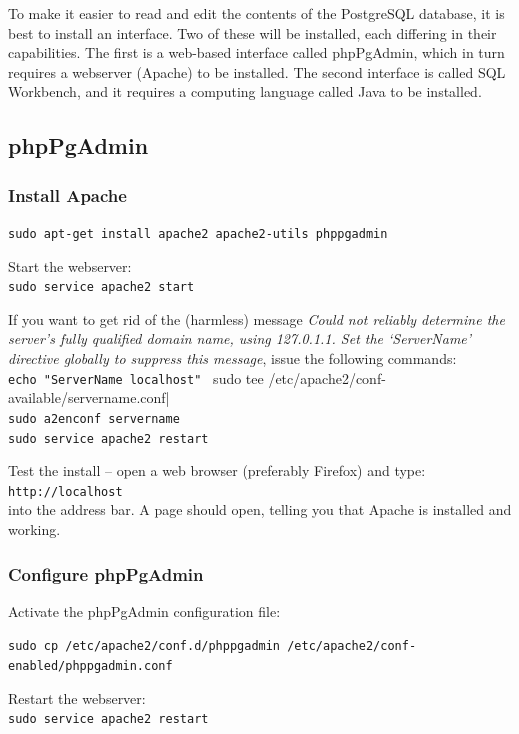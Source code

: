 To make it easier to read and edit the contents of the PostgreSQL database, it is best to install an interface.  Two of these will be installed, each differing in their capabilities.  The first is a web-based interface called phpPgAdmin, which in turn requires a webserver (Apache) to be installed.  The second interface is called SQL Workbench, and it requires a computing language called Java to be installed.

\subsection{phpPgAdmin}

\subsubsection{Install Apache}
\label{ss:apache}

\verb|sudo apt-get install apache2 apache2-utils phppgadmin|

Start the webserver:\\
\verb|sudo service apache2 start|

If you want to get rid of the (harmless) message \textit{Could not reliably determine the server's fully qualified domain name, using 127.0.1.1. Set the `ServerName' directive globally to suppress this message}, issue the following commands:\\
\verb|echo "ServerName localhost" | sudo tee /etc/apache2/conf-available/servername.conf|\\
\verb|sudo a2enconf servername|\\
\verb|sudo service apache2 restart|

Test the install -- open a web browser (preferably Firefox) and type:\\
\verb|http://localhost|\\
into the address bar. A page should open, telling you that Apache is installed and working.

\subsubsection{Configure phpPgAdmin}

Activate the phpPgAdmin configuration file:

\verb|sudo cp /etc/apache2/conf.d/phppgadmin /etc/apache2/conf-enabled/phppgadmin.conf|

Restart the webserver:\\
\verb|sudo service apache2 restart|


